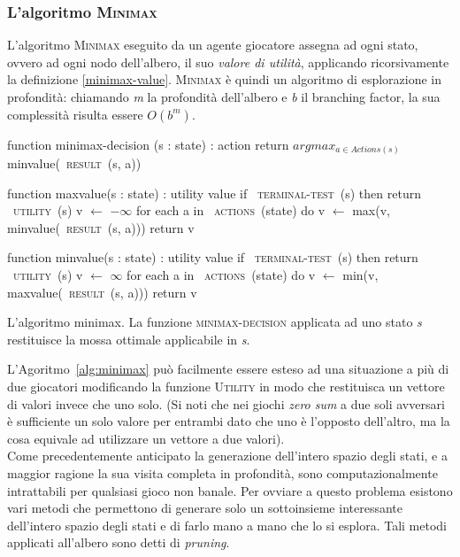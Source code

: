 %
%
%
%

\subsubsection*{L'algoritmo \textsc{Minimax}}

L'algoritmo \textsc{Minimax} eseguito da un agente giocatore assegna ad ogni stato, ovvero ad ogni nodo dell'albero, il suo \emph{valore di utilità}, applicando ricorsivamente la definizione \ref{minimax-value}.
\textsc{Minimax} è quindi un algoritmo di esplorazione in profondità: chiamando \emph{m} la profondità dell'albero e \emph{b} il branching factor, la sua complessità risulta essere $O(b^m)$.\\
\begin{algorithm}[!htb]
\begin{PseudoCode}[mathescape,escapechar=~]
function minimax-decision (s : state) : action
   return $argmax_{a \in Actions(s)}$ minvalue(~\textsc{result}~(s, a))

function maxvalue(s : state) : utility value
   if ~\textsc{terminal-test}~(s) then return ~\textsc{utility}~(s)
   v $ \leftarrow $ $ - \infty $
   for each a in ~\textsc{actions}~(state) do
      v $ \leftarrow $ max(v, minvalue(~\textsc{result}~(s, a)))
   return v
   
function minvalue(s : state) : utility value
   if ~\textsc{terminal-test}~(s) then return ~\textsc{utility}~(s)
   v $ \leftarrow $ $ \infty $
   for each a in ~\textsc{actions}~(state) do
      v $ \leftarrow $ min(v, maxvalue(~\textsc{result}~(s, a)))
   return v
\end{PseudoCode}
\caption{L'algoritmo minimax. La funzione \textsc{minimax-decision} applicata ad uno stato \emph{s} restituisce la mossa ottimale applicabile in \emph{s}. \cite{randw}}
\label{alg:minimax}
\end{algorithm}

\noindent
L'Agoritmo~\ref{alg:minimax} può facilmente essere esteso ad una situazione a più di due giocatori modificando la funzione \textsc{Utility} in modo che restituisca un vettore di valori invece che uno solo.
(Si noti che nei giochi \emph{zero sum} a due soli avversari è sufficiente un solo valore per entrambi dato che uno è l'opposto dell'altro, ma la cosa equivale ad utilizzare un vettore a due valori).\\
Come precedentemente anticipato la generazione dell'intero spazio degli stati, e a maggior ragione la sua visita completa in profondità, sono computazionalmente intrattabili per qualsiasi gioco non banale.
Per ovviare a questo problema esistono vari metodi che permettono di generare solo un sottoinsieme interessante dell'intero spazio degli stati e di farlo mano a mano che lo si esplora. Tali metodi applicati all'albero sono detti di \emph{pruning}.

